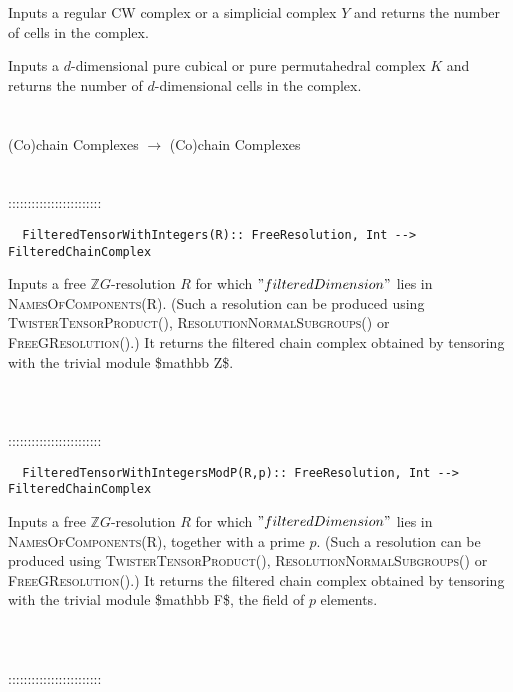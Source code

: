 \documentclass[a4paper,11pt]{report}
\begin{document}
{ 

Inputs a regular CW complex or a simplicial complex $Y$ and returns the number of cells in the complex. 

Inputs a $d$-dimensional pure cubical or pure permutahedral complex $K$ and returns the number of $d$-dimensional cells in the complex. \\
 \\
 \\
 (Co)chain Complexes $\longrightarrow $ (Co)chain Complexes \\
 \\
 \\
 ::::::::::::::::::::::::\\
 
\begin{verbatim}  FilteredTensorWithIntegers(R):: FreeResolution, Int --> FilteredChainComplex
\end{verbatim}


 Inputs a free $\mathbb ZG$-resolution $R$ for which $"filteredDimension"$ lies in \textsc{NamesOfComponents(R)}. (Such a resolution can be produced using \textsc{TwisterTensorProduct()}, \textsc{ResolutionNormalSubgroups()} or \textsc{FreeGResolution()}.) It returns the filtered chain complex obtained by tensoring with the
trivial module \$\texttt{}mathbb Z\$. \\
 \\
 \\
 \\
 ::::::::::::::::::::::::\\
 
\begin{verbatim}  FilteredTensorWithIntegersModP(R,p):: FreeResolution, Int --> FilteredChainComplex
\end{verbatim}


 Inputs a free $\mathbb ZG$-resolution $R$ for which $"filteredDimension"$ lies in \textsc{NamesOfComponents(R)}, together with a prime $p$. (Such a resolution can be produced using \textsc{TwisterTensorProduct()}, \textsc{ResolutionNormalSubgroups()} or \textsc{FreeGResolution()}.) It returns the filtered chain complex obtained by tensoring with the
trivial module \$\texttt{}mathbb F\$, the field of $p$ elements. \\
 \\
 \\
 \\
 ::::::::::::::::::::::::\\
 
}
\end{document}
